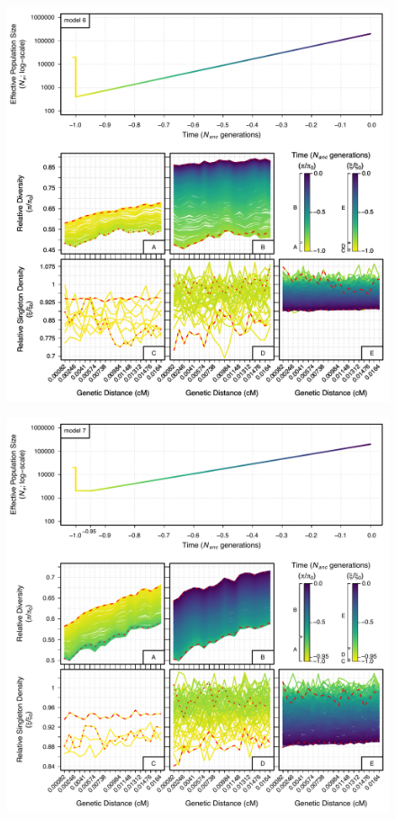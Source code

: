 \documentclass[9pt,twocolumn,twoside]{rilabRxiv}
\begin{document}
\begin{figure}[htb]\ContinuedFloat
    \centering
    \includegraphics[width=\linewidth]{figures/FigS14.pdf}
\end{figure}
\begin{figure}[htb]\ContinuedFloat
    \centering
    \includegraphics[width=\linewidth]{figures/FigS15.pdf}
\end{figure}
\end{document}
